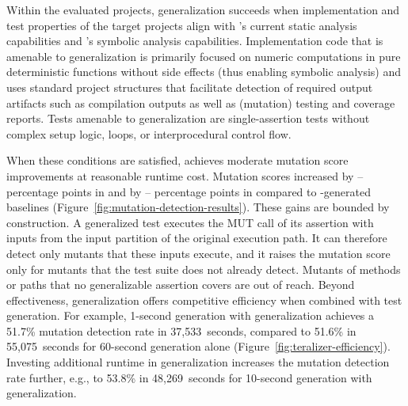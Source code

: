 Within the evaluated projects,
generalization succeeds when implementation and test properties
of the target projects align
with \ToolTeralizer{}'s current static analysis capabilities
and \ToolSPF{}'s symbolic analysis capabilities.
Implementation code that is amenable to generalization
is primarily focused on numeric computations
in pure deterministic functions without side effects
(thus enabling symbolic analysis)
and uses standard project structures that facilitate detection
of required output artifacts such as compilation outputs
as well as (mutation) testing and coverage reports.
Tests amenable to generalization are single-assertion tests
without complex setup logic, loops, or interprocedural control flow.

When these conditions are satisfied,
\ToolTeralizer{} achieves moderate mutation score improvements at reasonable runtime cost.
Mutation scores increased by
\TzEffectivenessEqbenchEvosuiteMutationImprovementMinPp{}--\TzEffectivenessEqbenchEvosuiteMutationImprovementMaxPp{}
percentage points in \DatasetsEqBenchEs{}
and by \TzEffectivenessCommonsEvosuiteMutationImprovementMinPp{}--\TzEffectivenessCommonsEvosuiteMutationImprovementMaxPp{}
percentage points in \DatasetsCommonsEs{}
compared to \ToolEvoSuite{}-generated baselines (Figure~\ref{fig:mutation-detection-results}).
These gains are bounded by construction.
A generalized test executes the MUT call of its assertion
with inputs from the input partition of the original execution path.
It can therefore detect only mutants that these inputs execute,
and it raises the mutation score only for mutants
that the \VariantInitial{} test suite does not already detect.
Mutants of methods or paths that no generalizable assertion covers are out of reach.
Beyond effectiveness, generalization offers competitive efficiency when combined with test generation.
For example, 1-second \ToolEvoSuite{} generation with \VariantNaiveB{} generalization
achieves a 51.7\% mutation detection rate in 37,533~seconds,
compared to 51.6\% in 55,075~seconds for 60-second generation alone
(Figure~\ref{fig:teralizer-efficiency}).
Investing additional runtime in generalization increases the mutation detection rate further,
e.g., to 53.8\% in 48,269~seconds for 10-second \ToolEvoSuite{} generation with \VariantImprovedC{} generalization.

